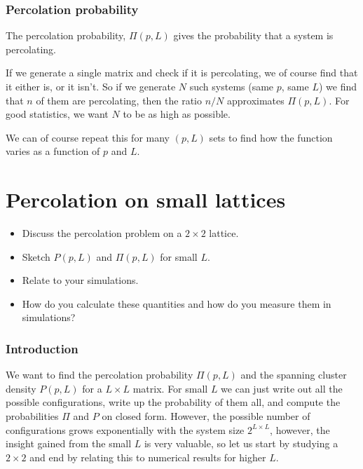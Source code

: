 \documentclass[a4paper, 11pt, notitlepage, english]{article}
\begin{document}
\subsubsection*{Percolation probability}

The percolation probability, $\Pi(p,L)$ gives the probability that a system is percolating. 

If we generate a single matrix and check if it is percolating, we of course find that it either is, or it isn't. So if we generate $N$ such systems (same $p$, same $L$) we find that $n$ of them are percolating, then the ratio $n/N$ approximates $\Pi(p,L)$. For good statistics, we want $N$ to be as high as possible. 

We can of course repeat this for many $(p, L)$ sets to find how the function varies as a function of $p$ and $L$.


\clearpage


\section{Percolation on small lattices}
\begin{itemize}
	\item Discuss the percolation problem on a $2\times 2$ lattice.
	\item Sketch $P(p, L)$ and $\Pi(p, L)$ for small $L$.
	\item Relate to your simulations.
	\item How do you calculate these quantities and how do you measure them in simulations?
\end{itemize}

   

\subsubsection*{Introduction}

We want to find the percolation probability $\Pi(p, L)$ and the spanning cluster density $P(p, L)$ for a $L\times L$ matrix. For small $L$ we can just write out all the possible configurations, write up the probability of them all, and compute the probabilities $\Pi$ and $P$ on closed form. However, the possible number of configurations grows exponentially with the system size $2^{L\times L}$, however, the insight gained from the small $L$ is very valuable, so let us start by studying a $2\times 2$ and end by relating this to numerical results for higher $L$.
\end{document}
